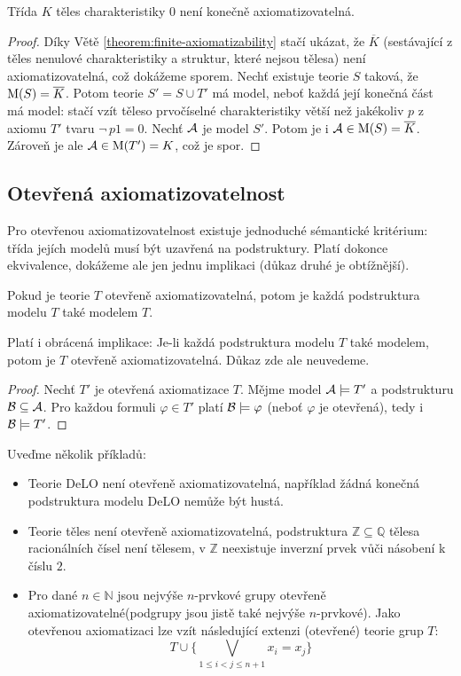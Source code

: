 \begin{proposition}
Třída $K$ těles charakteristiky $0$ není konečně axiomatizovatelná.   
\end{proposition}
\begin{proof}
Díky Větě \ref{theorem:finite-axiomatizability} stačí ukázat, že $\overline{K}$ (sestávající z těles nenulové charakteristiky a struktur, které nejsou tělesa) není axiomatizovatelná, což dokážeme sporem. Nechť existuje teorie $S$ taková, že $\operatorname{M}(S)=\overline{K}$. Potom teorie 
$S'=S\cup T'$ má model, neboť každá její konečná část má model: stačí vzít těleso prvočíselné charakteristiky větší než jakékoliv $p$ z axiomu $T'$ tvaru $\neg\, p1=0$. Nechť $\mathcal{A}$ je model $S'$. Potom je i $\mathcal{A}\in\operatorname{M}(S)=\overline{K}$. Zároveň je ale $\mathcal{A}\in\operatorname{M}(T')=K$, což je spor.
\end{proof}

\subsection{Otevřená axiomatizovatelnost}

Pro otevřenou axiomatizovatelnost existuje jednoduché sémantické kritérium: třída jejích modelů musí být uzavřená na podstruktury. Platí dokonce ekvivalence, dokážeme ale jen jednu implikaci (důkaz druhé je obtížnější).

\begin{theorem}\label{theorem:open-axiomatizability}
Pokud je teorie $T$ otevřeně axiomatizovatelná, potom je každá podstruktura modelu $T$ také modelem $T$.   
\end{theorem}

\begin{remark}
    Platí i obrácená implikace: Je-li každá podstruktura modelu $T$ také modelem, potom je $T$ otevřeně axiomatizovatelná. Důkaz zde ale neuvedeme.
\end{remark}

\begin{proof}
Nechť $T'$ je otevřená axiomatizace $T$. Mějme model $\mathcal{A}\models T'$  a podstrukturu $\mathcal{B}\subseteq\mathcal{A}$. Pro každou formuli $\varphi\in T'$ platí $\mathcal{B}\models\varphi$ (neboť $\varphi$ je otevřená), tedy i $\mathcal{B}\models T'$.  
\end{proof}

\begin{example}
    Uveďme několik příkladů:
    \begin{itemize}
        \item Teorie DeLO není otevřeně axiomatizovatelná, například žádná konečná podstruktura modelu DeLO nemůže být hustá.
        \item Teorie těles není otevřeně axiomatizovatelná, podstruktura $\mathbb Z\subseteq\mathbb Q$ tělesa racionálních čísel není tělesem, v $\mathbb Z$ neexistuje inverzní prvek vůči násobení k číslu $2$.
        \item Pro dané $n\in\mathbb N$ jsou nejvýše $n$-prvkové grupy otevřeně axiomatizovatelné(podgrupy jsou jistě také nejvýše $n$-prvkové). Jako otevřenou axiomatizaci lze vzít následující extenzi (otevřené) teorie grup $T$:
        $$
        T\cup \{\bigvee_{1\leq i<j\leq n+1}x_i=x_j\}
        $$
    \end{itemize}
\end{example}
